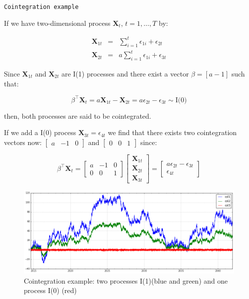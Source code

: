 \newpage
\texttt{Cointegration example}

If we have two-dimensional process $\mathbf{X}_t$, $t=1,\dots,T$ by:

\begin{eqnarray*}
\mathbf{X}_{1t} &=& \sum_{i=1}^t \epsilon_{1i} + \epsilon_{2t} \\
\mathbf{X}_{2t} &=& a \sum_{i=1}^t \epsilon_{1i} + \epsilon_{3t} 
\end{eqnarray*}

Since $\mathbf{X}_{1t}$ and $\mathbf{X}_{2t}$ are I(1) processes and there
exist a vector $\beta = [a -1]$ such that:

\[
\beta^\top \mathbf{X}_t = a \mathbf{X}_{1t} -\mathbf{X}_{2t} = 
a\epsilon_{2t} - \epsilon_{3t} \sim \text{I(0)}
\]

then, both processes are said to be cointegrated. 

If we add a I(0) process
$\mathbf{X}_{3t} = \epsilon_{4t}$  we find that there exists two cointegration
vectors now: $\begin{bmatrix}a &-1& 0\end{bmatrix}$ and $\begin{bmatrix}0
&0&1\end{bmatrix}$ since:

\[
\beta^\top \mathbf{X}_t = 
\begin{bmatrix}
a & -1 & 0 \\
0 & 0 & 1
\end{bmatrix} 
\begin{bmatrix} 
\mathbf{X}_{1t} \\
\mathbf{X}_{2t} \\
\mathbf{X}_{3t}
\end{bmatrix} = 
\begin{bmatrix}
a\epsilon_{2t} - \epsilon_{3t} \\
\epsilon_{4t}
\end{bmatrix}
\]



\begin{figure}[!h]
  \centering
  \includegraphics[width=\textwidth]{img/coint-example}
  \caption{Cointegration example: two processes I(1)(blue and green) and one process I(0) (red)}
  \label{fig:cointex}
\end{figure}



